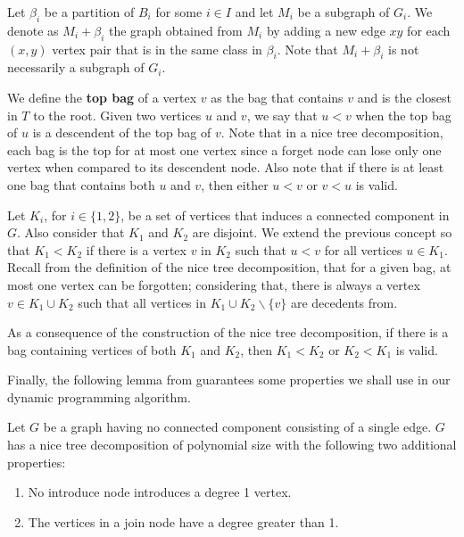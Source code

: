 Let \(\beta_i\) be a partition of \(B_i\) for some \(i \in I\) and let \(M_i\) be a subgraph of \(G_i\). We denote as \(M_i + \beta_i\) the graph obtained from $M_i$ by adding a new edge \(xy\) for each \((x, y)\) vertex pair that is in the same class in \(\beta_i\). Note that \(M_i + \beta_i\) is not necessarily a subgraph of \(G_i\).

We define the \textbf{top bag} of a vertex \(v\) as the bag that contains \(v\) and is the closest in $T$ to the root.
Given two vertices \(u\) and \(v\), we say that \(u < v\) when the top bag of \(u\) is a descendent of the top bag of \(v\). Note that in a nice tree decomposition, each bag is the top for at most one vertex since a forget node can lose only one vertex when compared to its descendent node. Also note that if there is at least one bag that contains both \(u\) and \(v\), then either \(u < v\) or \(v < u\) is valid.

Let \(K_i\), for \(i \in \{1, 2\}\), be a set of vertices that induces a connected component in \(G\). Also consider that \(K_1\) and \(K_2\) are disjoint. We extend the previous concept so that \(K_1 < K_2\) if there is a vertex \(v\) in \(K_2\) such that \(u < v\) for all vertices \(u \in K_1\). Recall from the definition of the nice tree decomposition, that for a given bag, at most one vertex can be forgotten; considering that, there is always a vertex \(v \in K_1 \cup K_2\) such that all vertices in \(K_1 \cup K_2 \backslash \{v\}\) are decedents from.

As a consequence of the construction of the nice tree decomposition, if there is a bag containing vertices of both \(K_1\) and \(K_2\), then \(K_1 < K_2\) or \(K_2 < K_1\) is valid.

Finally, the following lemma from \cite{Bateni} guarantees some properties we shall use in our dynamic programming algorithm.

\begin{flemma}\label{bateni_2_1}
Let \(G\) be a graph having no connected component consisting of a single edge. \(G\) has a nice tree decomposition of polynomial size with the following two additional properties:

\begin{enumerate}
    \item No introduce node introduces a degree 1 vertex.
    \item The vertices in a join node have a degree greater than 1.
\end{enumerate}

\end{flemma}

